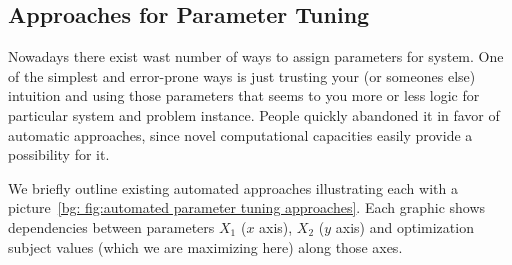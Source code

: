 \subsection{Approaches for Parameter Tuning}
Nowadays there exist wast number of ways to assign parameters for system. 
One of the simplest and error-prone ways is just trusting your (or someones else) intuition and using those parameters that seems to you more or less logic for particular system and problem instance. People quickly abandoned it in favor of automatic approaches, since novel computational capacities easily provide a possibility for it.

We briefly outline existing automated approaches illustrating each with a picture~\ref{bg: fig:automated parameter tuning approaches}. Each graphic shows dependencies between parameters $X_1$ ($x$ axis), $X_2$ ($y$ axis) and optimization subject values (which we are maximizing here) along those axes.

